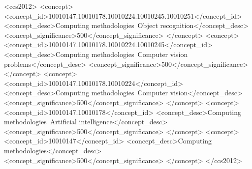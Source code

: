 \documentclass[sigconf]{acmart}
\begin{document}
\begin{CCSXML}
<ccs2012>
   <concept>
       <concept_id>10010147.10010178.10010224.10010245.10010251</concept_id>
       <concept_desc>Computing methodologies~Object recognition</concept_desc>
       <concept_significance>500</concept_significance>
       </concept>
   <concept>
       <concept_id>10010147.10010178.10010224.10010245</concept_id>
       <concept_desc>Computing methodologies~Computer vision problems</concept_desc>
       <concept_significance>500</concept_significance>
       </concept>
   <concept>
       <concept_id>10010147.10010178.10010224</concept_id>
       <concept_desc>Computing methodologies~Computer vision</concept_desc>
       <concept_significance>500</concept_significance>
       </concept>
   <concept>
       <concept_id>10010147.10010178</concept_id>
       <concept_desc>Computing methodologies~Artificial intelligence</concept_desc>
       <concept_significance>500</concept_significance>
       </concept>
   <concept>
       <concept_id>10010147</concept_id>
       <concept_desc>Computing methodologies</concept_desc>
       <concept_significance>500</concept_significance>
       </concept>
 </ccs2012>
\end{CCSXML}








\end{document}
